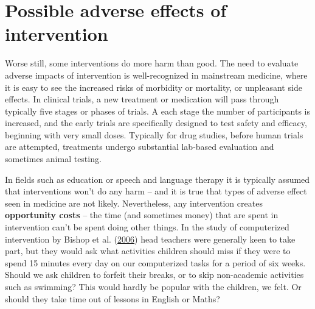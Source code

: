 \documentclass{krantz}
\begin{document}
\hypertarget{possible-adverse-effects-of-intervention}{%
\section{Possible adverse effects of intervention}\label{possible-adverse-effects-of-intervention}}

Worse still, some interventions do more harm than good. The need to evaluate adverse impacts of intervention is well-recognized in mainstream medicine, where it is easy to see the increased risks of morbidity or mortality, or unpleasant side effects. In clinical trials, a new treatment or medication will pass through typically five stages or phases of trials. A each stage the number of participants is increased, and the early trials are specifically designed to test safety and efficacy, beginning with very small doses. Typically for drug studies, before human trials are attempted, treatments undergo substantial lab-based evaluation and sometimes animal testing.

In fields such as education or speech and language therapy it is typically assumed that interventions won't do any harm -- and it is true that types of adverse effect seen in medicine are not likely. Nevertheless, any intervention creates \textbf{opportunity costs}  -- the time (and sometimes money) that are spent in intervention can't be spent doing other things. In the study of computerized intervention by Bishop et al. (\protect\hyperlink{ref-bishop2006}{2006}) head teachers were generally keen to take part, but they would ask what activities children should miss if they were to spend 15 minutes every day on our computerized tasks for a period of six weeks. Should we ask children to forfeit their breaks, or to skip non-academic activities such as swimming? This would hardly be popular with the children, we felt. Or should they take time out of lessons in English or Maths?
\end{document}
